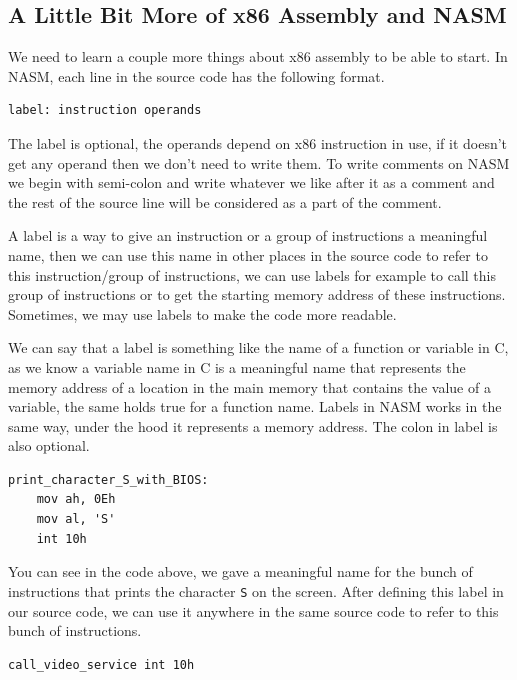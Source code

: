\subsection{A Little Bit More of x86 Assembly and
NASM}\label{a-little-bit-more-of-x86-assembly-and-nasm}

We need to learn a couple more things about x86 assembly to be able to
start. In NASM, each line in the source code has the following format.

\begin{lstlisting}
label: instruction operands
\end{lstlisting}

The label is optional, the operands depend on x86 instruction in use, if
it doesn't get any operand then we don't need to write them. To write
comments on NASM we begin with semi-colon and write whatever we like
after it as a comment and the rest of the source line will be considered
as a part of the comment.

A label is a way to give an instruction or a group of instructions a
meaningful name, then we can use this name in other places in the source
code to refer to this instruction/group of instructions, we can use
labels for example to call this group of instructions or to get the
starting memory address of these instructions. Sometimes, we may use
labels to make the code more readable.

We can say that a label is something like the name of a function or
variable in C, as we know a variable name in C is a meaningful name that
represents the memory address of a location in the main memory that
contains the value of a variable, the same holds true for a function
name. Labels in NASM works in the same way, under the hood it represents
a memory address. The colon in label is also optional.

\begin{lstlisting}
print_character_S_with_BIOS:
    mov ah, 0Eh
    mov al, 'S'
    int 10h
\end{lstlisting}

You can see in the code above, we gave a meaningful name for the bunch
of instructions that prints the character \lstinline!S! on the screen.
After defining this label in our source code, we can use it anywhere in
the same source code to refer to this bunch of instructions.

\begin{lstlisting}
call_video_service int 10h
\end{lstlisting}

